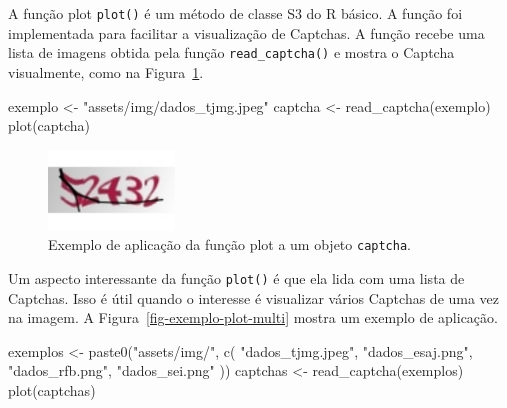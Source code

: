 \documentclass[12pt,twoside,brazilian]{book}
\newenvironment{Shaded}{\begin{snugshade}}{\end{snugshade}}
\newcommand{\FunctionTok}[1]{\textcolor[rgb]{0.28,0.35,0.67}{#1}}
\newcommand{\NormalTok}[1]{\textcolor[rgb]{0.00,0.23,0.31}{#1}}
\newcommand{\OtherTok}[1]{\textcolor[rgb]{0.00,0.23,0.31}{#1}}
\newcommand{\StringTok}[1]{\textcolor[rgb]{0.13,0.47,0.30}{#1}}
\begin{document}
A função plot \texttt{plot()} é um método de classe S3 do R básico. A
função foi implementada para facilitar a visualização de Captchas. A
função recebe uma lista de imagens obtida pela função
\texttt{read\_captcha()} e mostra o Captcha visualmente, como na
Figura~\ref{fig-exemplo-plot}.

\begin{Shaded}
\begin{Highlighting}[]
\NormalTok{exemplo }\OtherTok{\textless{}{-}} \StringTok{"assets/img/dados\_tjmg.jpeg"}
\NormalTok{captcha }\OtherTok{\textless{}{-}} \FunctionTok{read\_captcha}\NormalTok{(exemplo)}
\FunctionTok{plot}\NormalTok{(captcha)}
\end{Highlighting}
\end{Shaded}

\begin{figure}[H]

{\centering \includegraphics[width=0.3\textwidth,height=\textheight]{./resultados_files/figure-pdf/fig-exemplo-plot-1.pdf}

}

\caption{\label{fig-exemplo-plot}Exemplo de aplicação da função plot a
um objeto \texttt{captcha}.}

\end{figure}

Um aspecto interessante da função \texttt{plot()} é que ela lida com uma
lista de Captchas. Isso é útil quando o interesse é visualizar vários
Captchas de uma vez na imagem. A Figura~\ref{fig-exemplo-plot-multi}
mostra um exemplo de aplicação.

\begin{Shaded}
\begin{Highlighting}[]
\NormalTok{exemplos }\OtherTok{\textless{}{-}} \FunctionTok{paste0}\NormalTok{(}\StringTok{"assets/img/"}\NormalTok{, }\FunctionTok{c}\NormalTok{(}
  \StringTok{"dados\_tjmg.jpeg"}\NormalTok{,}
  \StringTok{"dados\_esaj.png"}\NormalTok{,}
  \StringTok{"dados\_rfb.png"}\NormalTok{,}
  \StringTok{"dados\_sei.png"}
\NormalTok{))}
\NormalTok{captchas }\OtherTok{\textless{}{-}} \FunctionTok{read\_captcha}\NormalTok{(exemplos)}
\FunctionTok{plot}\NormalTok{(captchas)}
\end{Highlighting}
\end{Shaded}
\end{document}
